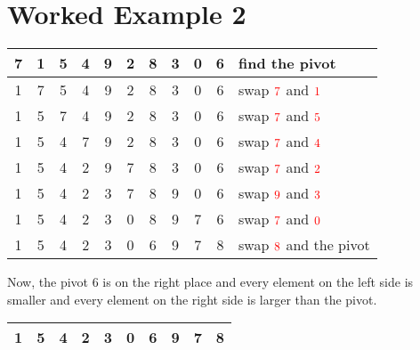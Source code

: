 \section{Worked Example 2}
\begin{center}
    \begin{tabular}{ | c | c | c | c | c | c | c | c | c | c | l | }
      \hline
      7 & 1 & 5 & 4 & 9 & 2 & 8 & 3 & 0 &\cellcolor{LightCyan}6 &find the \color{cyan}pivot\\ \hline %
      \color{red}1 & \color{red}7 & 5 & 4 & 9 & 2 & 8 & 3 & 0 &\cellcolor{LightCyan}6 &swap \(\color{red}7\) and \(\color{red}1\)\\ \hline %
      1 & \color{red}5 & \color{red}7 & 4 & 9 & 2 & 8 & 3 & 0 &\cellcolor{LightCyan}6 &swap \(\color{red}7\) and \(\color{red}5\)\\ \hline %
      1 & 5 & \color{red}4 & \color{red}7 & 9 & 2 & 8 & 3 & 0 &\cellcolor{LightCyan}6 &swap \(\color{red}7\) and \(\color{red}4\)\\ \hline %
      1 & 5 & 4 & \color{red}2 & 9 & \color{red} 7 & 8 & 3 & 0 &\cellcolor{LightCyan}6 &swap \(\color{red}7\) and \(\color{red}2\)\\ \hline %
      1 & 5 & 4 & 2 & \color{red}3 & 7 & 8 & \color{red}9 & 0 &\cellcolor{LightCyan}6 &swap \(\color{red}9\) and \(\color{red}3\)\\ \hline %
      1 & 5 & 4 & 2 & 3 & \color{red}0 & 8 & 9 & \color{red}7 &\cellcolor{LightCyan}6 &swap \(\color{red}7\) and \(\color{red}0\)\\ \hline %
      1 & 5 & 4 & 2 & 3 & 0 & \color{cyan}6 & 9 & 7 & \color{red}8 &swap \(\color{red}8\) and the {\color{cyan}pivot}\\ \hline %
    \end{tabular}
\end{center}

Now, the pivot \(6\) is on the right place and every element on the left side is smaller and every element on the right side is larger than the pivot.

\begin{center}
    \begin{tabular}{ | c | c | c | c | c | c || c || c | c | c | }
        \hline
        1 & 5 & 4 & 2 & 3 & 0 & \cellcolor{LightCyan}6 & 9 & 7 & 8 \\ \hline
    \end{tabular}
\end{center}

